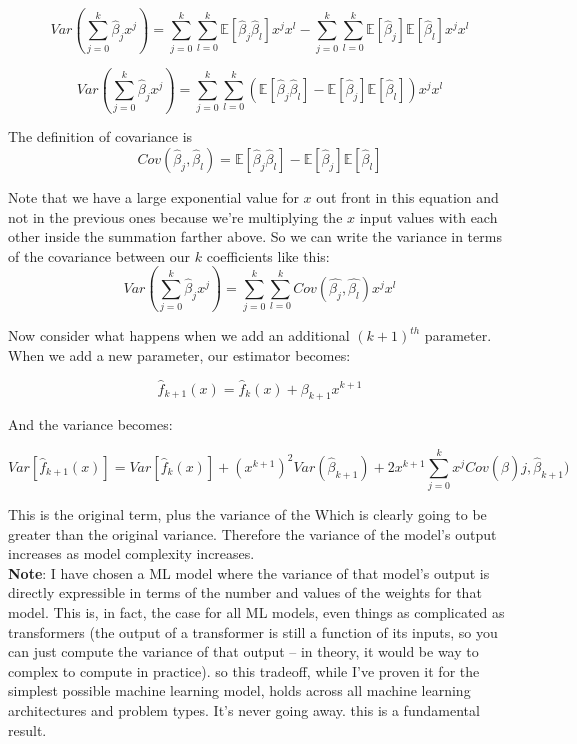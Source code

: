 \documentclass[12pt]{article}
\begin{document}
\[Var\left(\sum_{j=0}^k \hat{\beta}_j x^j\right) = \sum_{j=0}^k \sum_{l=0}^k \mathbb{E}\left[\hat{\beta}_j \hat{\beta}_l\right] x^j x^l -  \sum_{j=0}^{k} \sum_{l=0}^{k} \mathbb{E} \left[ \hat{\beta}_j \right] \mathbb{E} \left[ \hat{\beta}_l \right] x^j x^l\]

\[Var\left(\sum_{j=0}^k \hat{\beta}_j x^j\right) = \sum_{j=0}^k \sum_{l=0}^k \left(\mathbb{E}\left[\hat{\beta}_j \hat{\beta}_l\right] - \mathbb{E} \left[ \hat{\beta}_j \right] \mathbb{E} \left[ \hat{\beta}_l \right]\right)x^j x^l\]

The definition of covariance is 
\[
Cov(\hat{\beta}_j, \hat{\beta}_l) = \mathbb{E}[\hat{\beta}_j \hat{\beta}_l] - \mathbb{E}[\hat{\beta}_j] \mathbb{E}[\hat{\beta}_l]
\]

Note that we have a large exponential value for \(x\) out front in this equation and not in the previous ones because we're multiplying the \(x\) input values with each other inside the summation farther above.
So we can write the variance in terms of the covariance between our \(k\) coefficients like this:
\[Var\left(\sum_{j=0}^k \hat{\beta}_j x^j\right) =  \sum_{j=0}^k \sum_{l=0}^k Cov(\hat{\beta_j}, \hat{\beta_l})x^j x^l\]

Now consider what happens when we add an additional \((k+1)^{th}\) parameter. When we add a new parameter, our estimator becomes:

\[\hat{f}_{k+1}(x) = \hat{f}_k(x) + \beta_{k+1}x^{k+1}\]

And the variance becomes:

\[Var[\hat{f}_{k+1}(x)] = Var[\hat{f}_{k}(x)] + (x^{k+1})^2Var(\hat{\beta}_{k+1}) + 2x^{k+1}\sum_{j=0}^k x^j Cov(\hat{\beta})j, \hat{\beta}_{k+1})\]

This is the original term, plus the variance of the Which is clearly going to be greater than the original variance. Therefore the variance of the model's output increases as model complexity increases. \\

\textbf{Note}: I have chosen a ML model where the variance of that model's output is directly expressible in terms of the number and values of the weights for that model. This is, in fact, the case for all ML models, even things as complicated as transformers (the output of a transformer is still a function of its inputs, so you can just compute the variance of that output -- in theory, it would be way to complex to compute in practice). so this tradeoff, while I've proven it for the simplest possible machine learning model, holds across all machine learning architectures and problem types. It's never going away. this is a fundamental result. 
\end{document}

